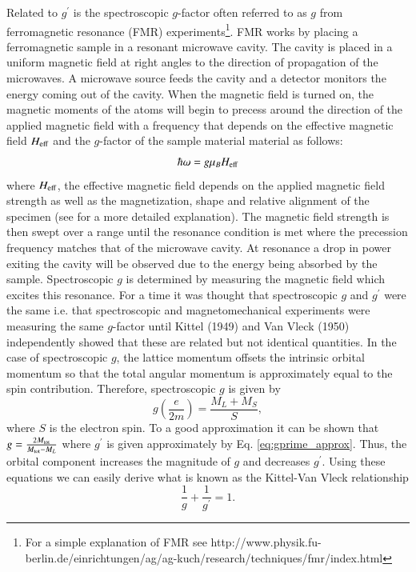 \documentclass[preprint,12pt]{elsarticle}
\begin{document}
Related to $g^{\prime}$ is the spectroscopic $g$-factor often referred to as $g$ from ferromagnetic resonance (FMR) experiments\footnote{For a simple explanation of FMR see http://www.physik.fu-berlin.de/einrichtungen/ag/ag-kuch/research/techniques/fmr/index.html}. FMR works by placing a ferromagnetic sample in a resonant microwave cavity. The cavity is placed in a uniform magnetic field at right angles to the direction of propagation of the microwaves. A microwave source feeds the cavity and a detector monitors the energy coming out of the cavity. When the magnetic field is turned on, the magnetic moments of the atoms will begin to precess around the direction of the applied magnetic field with a frequency that depends on the effective magnetic field $H_{\rm eff}$ and the $g$-factor of the sample material material as follows:
\begin{equation}
\hbar\omega=g\mu_BH_{\rm eff}
\label{eq:fmr}
\end{equation}
where $H_{\rm eff}$, the effective magnetic field depends on the applied magnetic field strength as well as the magnetization, shape and relative alignment of the specimen (see \cite{Kittel1949, Smit1959} for a more detailed explanation). The magnetic field strength is then swept over a range until the resonance condition is met where the precession frequency matches that of the microwave cavity. At resonance a drop in power exiting the cavity will be observed due to the energy being absorbed by the sample. Spectroscopic $g$ is determined by measuring the magnetic field which excites this resonance. For a time it was thought that spectroscopic $g$ and $g^{\prime}$ were the same i.e. that spectroscopic and magnetomechanical experiments were measuring the same $g$-factor until Kittel (1949)\cite{Kittel1949} and Van Vleck (1950)\cite{Vleck1950} independently showed that these are related but not identical quantities. In the case of spectroscopic $g$, the lattice momentum offsets the intrinsic orbital momentum so that the total angular momentum is approximately equal to the spin contribution\cite{Kittel1949, Reck1969}. Therefore, spectroscopic $g$ is given by
\[
g\left(\frac{e}{2m}\right)=\frac{M_{L}+M_{S}}{S},
\]
where $S$ is the electron spin. To a good approximation it can be shown that $g=\frac{2M_{\rm tot}}{M_{\rm tot}-{M_{L}}}$ where $g^{\prime}$ is given approximately by Eq. \ref{eq:gprime_approx}. Thus, the orbital component increases the magnitude of $g$ and decreases $g^{\prime}$. Using these equations we can easily derive what is known as the Kittel-Van Vleck relationship 
\begin{equation}
\frac{1}{g}+\frac{1}{g^{\prime}}=1.
\label{eq:kittelvanvleck}
\end{equation}
\end{document}
